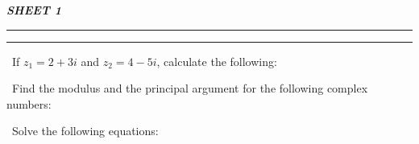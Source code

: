 \documentclass[12pt]{exam}
\begin{document}
\begin{center}
    \bfseries\itshape\Huge
    SHEET 1
\end{center}
\hrule\vspace{0.2em}\hrule
\vspace{1em}

\begin{questions}
\large
\question\ If \(z_1 = 2 + 3i\) and \(z_2 = 4 - 5i\), calculate the following:

\vspace{1em}
\question\ Find the modulus and the principal argument for the following complex numbers:

\vspace{1em}

\question\ Solve the following equations:
\end{questions}
\end{document}
